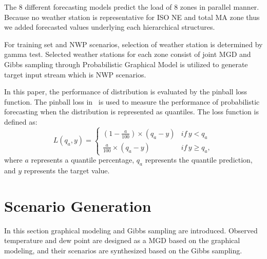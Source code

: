 \documentclass[journal]{IEEEtran} %
\begin{document}
The 8 different forecasting models predict the load of 8 zones in parallel manner. Because no weather station is representative for ISO NE and total MA zone thus we added forecasted values underlying each hierarchical structures. 

For training set and NWP scenarios, selection of weather station is determined by gamma test. Selected weather stations for each zone consist of joint MGD and Gibbs sampling through Probabilistic Graphical Model is utilized to generate target input stream which is NWP scenarios.


 In this paper, the performance of distribution is evaluated by the pinball loss function. The pinball loss in~\cite{Hong2016} is used to measure the performance of probabilistic forecasting when the distribution is represented as quantiles. The loss function is defined as:
\begin{equation}
L({q_a},y) = \left\{ {\begin{array}{*{20}{c}}
  {(1 - \frac{a}{{100}}) \times ({q_a} - y)}&{if\,y < {q_a}} \\ 
  {\frac{a}{{100}} \times ({q_a} - y)}&{if\,y \geq {q_a}},
\end{array}} \right.
\end{equation}
where $a$ represents a quantile percentage, $q_a$ represents the quantile prediction, and $y$ represents the target value.


\section{Scenario Generation}

In this section graphical modeling and Gibbs sampling are introduced. Observed temperature and dew point are designed as a MGD based on the graphical modeling, and their scenarios are synthesized based on the Gibbs sampling.



\end{document}
